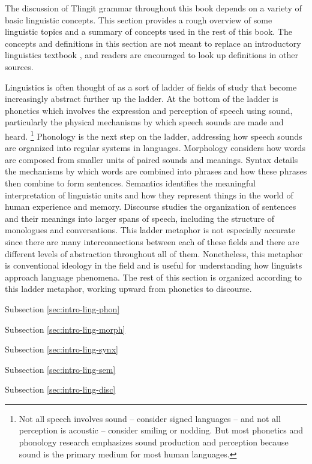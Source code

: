The discussion of Tlingit grammar throughout this book depends on a variety of basic linguistic concepts.
This section provides a rough overview of some linguistic topics and a summary of concepts used in the rest of this book.
The concepts and definitions in this section are not meant to replace an introductory linguistics textbook \parencites[e.g.][]{radford-atkinson-britain-etc:2009}{yule:2010}{anderson:2018}, and readers are encouraged to look up definitions in other sources.

Linguistics is often thought of as a sort of ladder of fields of study that become increasingly abstract further up the ladder.
At the bottom of the ladder is phonetics which involves the expression and perception of speech using sound, particularly the physical mechanisms by which speech sounds are made and heard.%
\footnote{Not all speech involves sound – consider signed languages – and not all perception is acoustic – consider smiling or nodding. But most phonetics and phonology research emphasizes sound production and perception because sound is the primary medium for most human languages.}
Phonology is the next step on the ladder, addressing how speech sounds are organized into regular systems in languages.
Morphology considers how words are composed from smaller units of paired sounds and meanings.
Syntax details the mechanisms by which words are combined into phrases and how these phrases then combine to form sentences.
Semantics identifies the meaningful interpretation of linguistic units and how they represent things in the world of human experience and memory.
Discourse studies the organization of sentences and their meanings into larger spans of speech, including the structure of monologues and conversations.
This ladder metaphor is not especially accurate since there are many interconnections between each of these fields and there are different levels of abstraction throughout all of them.
Nonetheless, this metaphor is conventional ideology in the field and is useful for understanding how linguists approach language phenomena.
The rest of this section is organized according to this ladder metaphor, working upward from phonetics to discourse.

Subsection \ref{sec:intro-ling-phon} 

Subsection \ref{sec:intro-ling-morph}

Subsection \ref{sec:intro-ling-synx}

Subsection \ref{sec:intro-ling-sem}

Subsection \ref{sec:intro-ling-disc}

